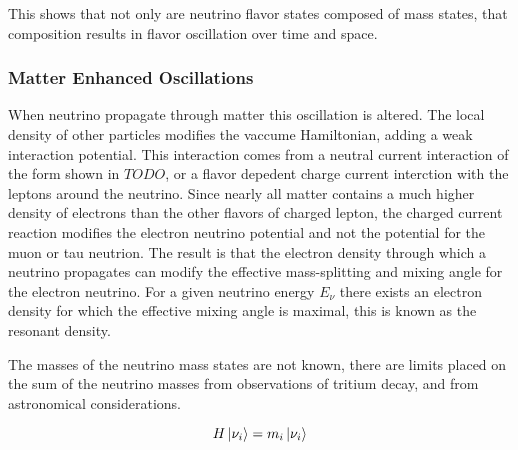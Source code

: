 This shows that not only are neutrino flavor states
composed of mass states, that composition results
in flavor oscillation over time and space.

\subsubsection{Matter Enhanced Oscillations}
When neutrino propagate through matter this oscillation is altered.
The local density of other particles modifies the vaccume Hamiltonian,
adding a weak interaction potential.
This interaction comes from a neutral current interaction of the form
shown in $TODO$, or a flavor depedent charge current interction with the
leptons around the neutrino.
Since nearly all matter contains a much higher density of electrons
than the other flavors of charged lepton, the charged current reaction
modifies the electron neutrino potential and not the potential for the muon
or tau neutrion.
The result is that the electron density through which a neutrino propagates
can modify the effective mass-splitting and mixing angle for the electron
neutrino.
For a given neutrino energy $E_{\nu}$ there exists an electron density for which
the effective mixing angle is maximal, this is known as the resonant density.

The masses of the neutrino mass states are not known, there are limits placed
on the sum of the neutrino masses from observations of tritium decay, and
from astronomical considerations. %


\begin{equation}
    H \ket{\nu_i} = m_i \ket{\nu_i}
\end{equation}


